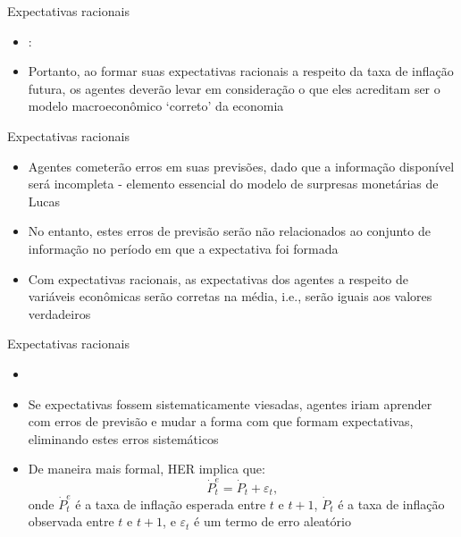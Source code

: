 \documentclass[10pt]{beamer}
\begin{document}
\begin{frame}{Expectativas racionais}
    \begin{itemize}
        \item {}:
        
        \bigskip
        \item Portanto, ao formar suas expectativas racionais a respeito da taxa de inflação futura, os agentes deverão levar em consideração o que eles acreditam ser o modelo macroeconômico `correto' da economia
    \end{itemize}
\end{frame}

\begin{frame}{Expectativas racionais}
    \begin{itemize}
        \item Agentes cometerão erros em suas previsões, dado que a informação disponível será incompleta - elemento essencial do modelo de surpresas monetárias de Lucas
        \bigskip
        \item No entanto, estes erros de previsão serão não relacionados ao conjunto de informação no período em que a expectativa foi formada
        \bigskip
        \item Com expectativas racionais, as expectativas dos agentes a respeito de variáveis econômicas serão corretas na média, i.e., serão iguais aos valores verdadeiros
    \end{itemize}
\end{frame}

\begin{frame}{Expectativas racionais}
    \begin{itemize}
        \item {}
        \bigskip
        \item Se expectativas fossem sistematicamente viesadas, agentes iriam aprender com erros de previsão e mudar a forma com que formam expectativas, eliminando estes erros sistemáticos
        \bigskip
        \item De maneira mais formal, HER implica que:
        \begin{equation}
            \dot{P}_t^e = \dot{P}_t + \varepsilon_t,
            \label{eq2}
        \end{equation}
        onde $\dot{P}_t^e$ é a taxa de inflação esperada entre $t$ e $t+1$, $\dot{P}_t$ é a taxa de inflação observada entre $t$ e $t+1$, e $\varepsilon_t$ é um termo de erro aleatório
    \end{itemize}
\end{frame}
\end{document}
